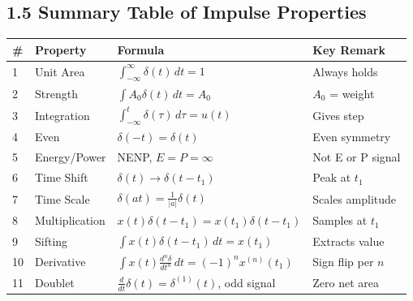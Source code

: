 \documentclass[10pt,a4paper]{article}
\begin{document}
\begin{propbox}
\begin{center}
\end{center}
\end{propbox}

\subsection*{1.5 Summary Table of Impulse Properties}

{\small
\begin{tabular}{@{}llll@{}}
\toprule
\textbf{\#} & \textbf{Property} & \textbf{Formula} & \textbf{Key Remark}\\
\midrule
1 & Unit Area      & $\int_{-\infty}^{\infty}\delta(t)\,dt=1$ & Always holds \\[3pt]
2 & Strength       & $\int A_0\delta(t)\,dt=A_0$ & $A_0$ = weight \\[3pt]
3 & Integration    & $\int_{-\infty}^{t}\delta(\tau)\,d\tau=u(t)$ & Gives step \\[3pt]
4 & Even           & $\delta(-t)=\delta(t)$ & Even symmetry \\[2pt]
5 & Energy/Power   & NENP, $E=P=\infty$ & Not E or P signal \\[2pt]
6 & Time Shift     & $\delta(t)\to\delta(t-t_1)$ & Peak at $t_1$ \\[2pt]
7 & Time Scale     & $\delta(at)=\tfrac{1}{|a|}\delta(t)$ & Scales amplitude \\[3pt]
8 & Multiplication & $x(t)\delta(t-t_1)=x(t_1)\delta(t-t_1)$ & Samples at $t_1$ \\[3pt]
9 & Sifting        & $\int x(t)\delta(t-t_1)\,dt=x(t_1)$ & Extracts value \\[3pt]
10& Derivative     & $\int x(t)\frac{d^n\delta}{dt^n}\,dt=(-1)^n x^{(n)}(t_1)$ & Sign flip per $n$ \\[3pt]
11& Doublet        & $\frac{d}{dt}\delta(t)=\delta^{(1)}(t)$, odd signal & Zero net area \\[2pt]
\bottomrule
\end{tabular}
}
\end{document}
